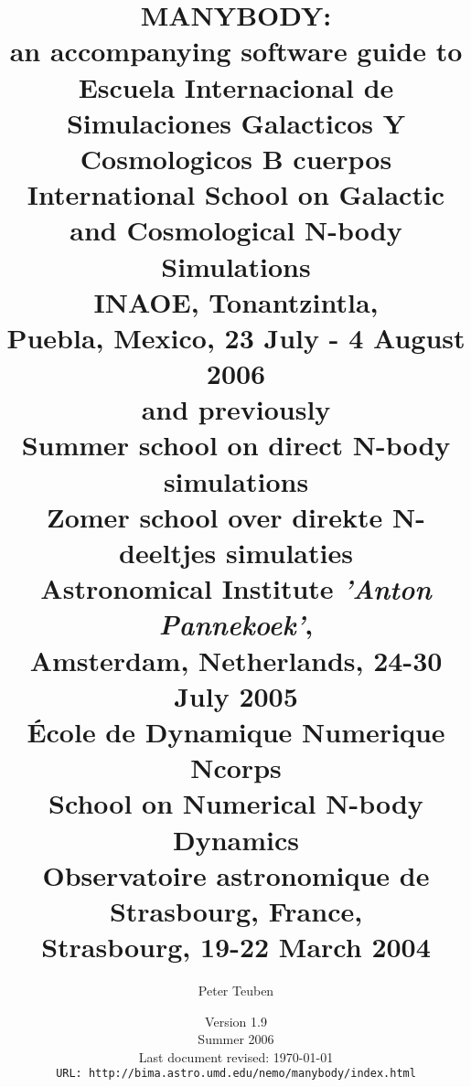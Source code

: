 

\nonstopmode			%

\documentclass[headsepline,normalheadings]{book}



\usepackage{epsfig}


\usepackage{html}
\usepackage{nemo}

\title{ 
{\Huge MANYBODY:} \\
  {\LARGE an accompanying software guide to }\\
  {\bf  Escuela Internacional de Simulaciones Galacticos Y Cosmologicos B cuerpos} \\
  {\bf  International School on Galactic and Cosmological N-body Simulations} \\
  { INAOE, Tonantzintla, \\
    Puebla, Mexico, 23 July - 4 August 2006}\\
  {\small and previously} \\
  {\bf  Summer school on direct N-body simulations} \\
  {\bf  Zomer school over direkte N-deeltjes simulaties} \\
  { Astronomical Institute {\it 'Anton Pannekoek'}, \\
    Amsterdam, Netherlands, 24-30 July 2005}\\
  { \bf \'Ecole de Dynamique Numerique Ncorps }\\
  { \bf School on Numerical N-body Dynamics }\\
  { Observatoire astronomique de Strasbourg, France, \\
    Strasbourg, 19-22 March 2004}
}


\author{
 {Peter Teuben } \\
       }

\date{{\small Version 1.9} \\
      {\small Summer 2006} \\
      {\small Last document revised: \today} \\ 
      {\small \tt URL: http://bima.astro.umd.edu/nemo/manybody/index.html} \\
     }


